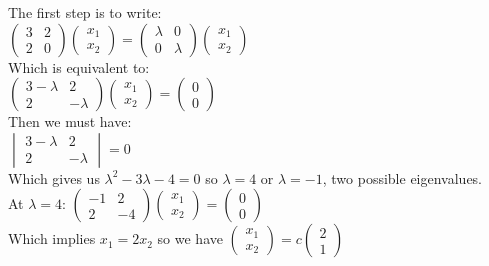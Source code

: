 \documentclass[10pt]{article}
\begin{document}
\begin{multicols}{2}
\begin{itemize}
    The first step is to write:\\
    $\begin{pmatrix}3 &2\\2 &0\end{pmatrix}\begin{pmatrix}x_{1}\\x_{2}\end{pmatrix}=\begin{pmatrix}\lambda &0\\0&\lambda\end{pmatrix}\begin{pmatrix}x_{1}\\x_{2}\end{pmatrix}$\\
    Which is equivalent to:\\
    $\begin{pmatrix}3-\lambda &2\\2&-\lambda\end{pmatrix}\begin{pmatrix}x_{1}\\x_2\end{pmatrix}=\begin{pmatrix}0\\0\end{pmatrix}$\\
    Then we must have:\\
    $\begin{vmatrix}3-\lambda &2\\2&-\lambda\end{vmatrix}=0$\\
    Which gives us $\lambda^{2}-3\lambda-4=0$ so $\lambda=4$ or $\lambda=-1$, two possible eigenvalues.\\
    At $\lambda=4$: $\begin{pmatrix}
        -1 &2\\2&-4
    \end{pmatrix}\begin{pmatrix}x_{1}\\x_{2}\end{pmatrix}=\begin{pmatrix}0\\0\end{pmatrix}$\\
    Which implies $x_{1}=2x_{2}$ so we have $\begin{pmatrix}x_{1}\\x_{2}\end{pmatrix}=c\begin{pmatrix}2\\1\end{pmatrix}$\\

\end{itemize}
\end{multicols}
\end{document}
